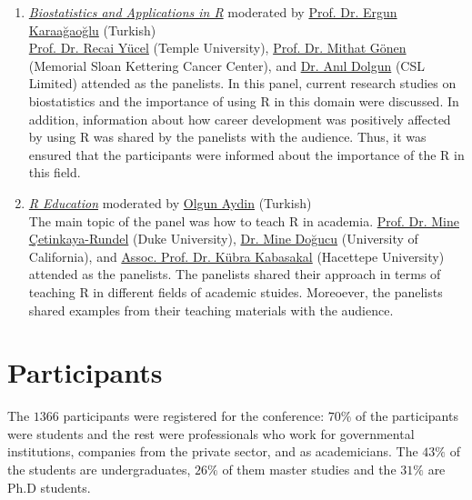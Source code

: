 \begin{enumerate}
    \item \textit{\href{https://www.youtube.com/watch?v=ZDMXOOVqwI8}{Biostatistics and Applications in R}} moderated by \href{https://www.linkedin.com/in/ergun-karaagaoglu-8960404b/}{Prof. Dr. Ergun Karaağaoğlu} (Turkish)\\
    \href{https://cph.temple.edu/about/faculty-staff/recai-yucel-tuo13025}{Prof. Dr. Recai Yücel} (Temple University), \href{https://www.mskcc.org/profile/mithat-gonen}{Prof. Dr. Mithat Gönen} (Memorial Sloan Kettering Cancer Center), and \href{https://www.linkedin.com/in/anildolgun}{Dr. Anıl Dolgun} (CSL Limited) attended as the panelists. In this panel, current research studies on biostatistics and the importance of using R in this domain were discussed. In addition, information about how career development was positively affected by using R was shared by the panelists with the audience. Thus, it was ensured that the participants were informed about the importance of the R in this field.\\

    \item \textit{\href{https://www.youtube.com/watch?v=z2gTRUO-G58}{R Education}} moderated by \href{https://www.linkedin.com/in/olgun-aydin/}{Olgun Aydin} (Turkish)\\
    The main topic of the panel was how to teach R in academia. \href{https://www.linkedin.com/in/minec/}{Prof. Dr. Mine Çetinkaya-Rundel} (Duke University), \href{https://www.linkedin.com/in/minedogucu/}{Dr. Mine Doğucu} (University of California), and \href{https://www.linkedin.com/in/k\%C3\%BCbra-atalay-kabasakal-218a7131/}{Assoc. Prof. Dr. Kübra Kabasakal} (Hacettepe University) attended as the panelists. The panelists shared their approach in terms of teaching R in different fields of academic stuides. Moreoever, the panelists shared examples from their teaching materials with the audience.
\end{enumerate}

\section{Participants}

The $1366$ participants were registered for the conference: $70\%$ of the participants were students and the rest were professionals who work for governmental institutions, companies from the private sector, and as academicians. The $43\%$ of the students are undergraduates, $26\%$ of them master studies and the $31\%$ are Ph.D students.

